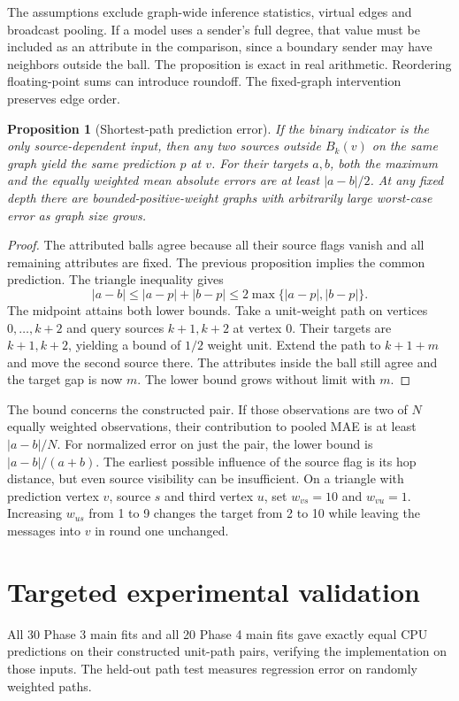 \documentclass[11pt]{article}
\newtheorem{proposition}{Proposition}
\begin{document}
The assumptions exclude graph-wide inference statistics, virtual edges and broadcast pooling. If a model uses a sender's full degree, that value must be included as an attribute in the comparison, since a boundary sender may have neighbors outside the ball. The proposition is exact in real arithmetic. Reordering floating-point sums can introduce roundoff. The fixed-graph intervention preserves edge order.

\begin{proposition}[Shortest-path prediction error]
If the binary indicator is the only source-dependent input, then any two sources outside \(B_k(v)\) on the same graph yield the same prediction \(p\) at \(v\). For their targets \(a,b\), both the maximum and the equally weighted mean absolute errors are at least \(|a-b|/2\). At any fixed depth there are bounded-positive-weight graphs with arbitrarily large worst-case error as graph size grows.
\end{proposition}
\begin{proof}
The attributed balls agree because all their source flags vanish and all remaining attributes are fixed. The previous proposition implies the common prediction. The triangle inequality gives
\[
|a-b|\le |a-p|+|b-p|\le 2\max\{|a-p|,|b-p|\}.
\]
The midpoint attains both lower bounds. Take a unit-weight path on vertices \(0,\ldots,k+2\) and query sources \(k+1,k+2\) at vertex \(0\). Their targets are \(k+1,k+2\), yielding a bound of \(1/2\) weight unit. Extend the path to \(k+1+m\) and move the second source there. The attributes inside the ball still agree and the target gap is now \(m\). The lower bound grows without limit with \(m\).
\end{proof}

The bound concerns the constructed pair. If those observations are two of \(N\) equally weighted observations, their contribution to pooled MAE is at least \(|a-b|/N\). For normalized error on just the pair, the lower bound is \(|a-b|/(a+b)\). The earliest possible influence of the source flag is its hop distance, but even source visibility can be insufficient. On a triangle with prediction vertex \(v\), source \(s\) and third vertex \(u\), set \(w_{vs}=10\) and \(w_{vu}=1\). Increasing \(w_{us}\) from 1 to 9 changes the target from 2 to 10 while leaving the messages into \(v\) in round one unchanged.

\section{Targeted experimental validation}
All 30 Phase 3 main fits and all 20 Phase 4 main fits gave exactly equal CPU predictions on their constructed unit-path pairs, verifying the implementation on those inputs. The held-out path test measures regression error on randomly weighted paths.
\end{document}
